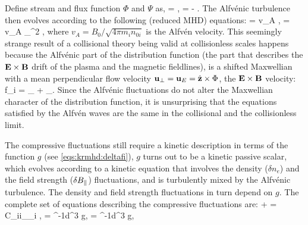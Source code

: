     Define stream and flux function $\Phi$ and $\Psi$ as,
    \beq
        \Phi = \phi, \quad \Psi = - 
        \label{eqs:eq:PhiPsi}.
    \eeq
    The Alfv\'{e}nic turbulence then evolves according to the following (reduced MHD) equations:
    \beq
         = v_A \cdot\nabla \Phi, \label{eqs:krmhd:epar}
    \eeq
    \beq
         = v_A \cdot \nabla \nabla_\perp^2
        \Psi,\label{eqs:krmhd:vort}
    \eeq
    where $v_A = B_0/\sqrt{4 \pi m_i n_{0i}}$ is the Alfv\'{e}n velocity. This seemingly
    strange result of a collisional theory being valid at collisionless scales happens
    because the Alfv\'{e}nic part of the distribution function (the part that describes
    the $\mathbf{E} \times \mathbf{B}$ drift of the plasma and the magnetic fieldlines), is a 
    shifted Maxwellian with a mean perpendicular flow velocity $\mathbf{u}_\perp = \mathbf{u}_E =
    \hat{\mathbf{z}}\times\Phi$, the $\mathbf{E} \times \mathbf{B}$ velocity:     
    \beq
        f_i = _{} +
        _{}. \label{eqs:krmhd:deltafi}
    \eeq
    Since the Alfv\'{e}nic fluctuations do not alter the Maxwellian character of the
    distribution function, it is unsurprising that the equations satisfied by the
    Alfv\'{e}n waves are the same in the collisional and the collisionless limit.

    The compressive fluctuations still require a kinetic description in terms of the
    function $g$ (see \eqref{eqs:krmhd:deltafi}), $g$ turns out to be a
    kinetic passive
    scalar, which evolves according to a kinetic equation that involves the density 
    ($\delta n_e$) and the field strength ($\delta B_\parallel$) fluctuations, and is turbulently mixed 
    by the Alfv\'{e}nic turbulence. The density and field strength fluctuations in turn depend on
    $g$. The complete set of equations describing the compressive fluctuations are:
    \beq
         + \vpar {} \cdot \nabla {} = \lt\langle C_{ii}\rt\rangle_{_i}
        ,\label{eqs:krmhd:gkin}
    \eeq
    \beq
         = ^{-1}\int d^3 
        g,\label{eqs:krmhd:dne}
    \eeq
    \beq
         = ^{-1}\int d^3 
        g,\label{eqs:krmhd:dbpar}
    \eeq

